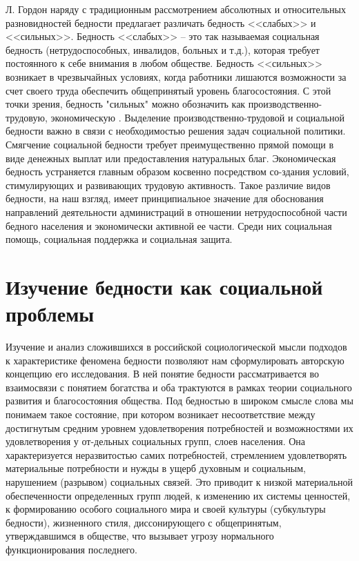 Л. Гордон наряду с традиционным рассмотрением абсолютных и относительных 
разновидностей бедности предлагает различать бедность <<слабых>> и <<сильных>>. 
Бедность <<слабых>> -- это так называемая социальная бедность (нетрудоспособных, 
инвалидов, больных и т.д.), которая требует постоянного к себе внимания в 
любом обществе. Бедность <<сильных>> возникает в чрезвычайных условиях, когда 
работники лишаются возможности за счет своего труда обеспечить общепринятый 
уровень благосостояния. С этой точки зрения, бедность "сильных" можно 
обозначить как производственно-трудовую, экономическую \cite{volch_s2}. 
Выделение производственно-трудовой и социальной бедности важно в связи с 
необходимостью решения задач социальной политики. Смягчение социальной 
бедности требует преимущественно прямой помощи в виде денежных выплат или 
предоставления натуральных благ. Экономическая бедность устраняется главным 
образом косвенно посредством со-здания условий, стимулирующих и развивающих 
трудовую активность. Такое различие видов бедности, на наш взгляд, имеет 
принципиальное значение для обоснования направлений деятельности 
администраций в отношении нетрудоспособной части бедного населения и 
экономически активной ее части. Среди них социальная помощь, социальная 
поддержка и социальная защита.

\chapter{Изучение бедности как социальной проблемы}
Изучение и анализ сложившихся в российской социологической мысли подходов к 
характеристике феномена бедности позволяют нам сформулировать авторскую 
концепцию его исследования. В ней понятие бедности рассматривается во 
взаимосвязи с понятием богатства и оба трактуются в рамках теории социального 
развития и благосостояния общества. Под бедностью в широком смысле слова мы 
понимаем такое состояние, при котором возникает несоответствие между 
достигнутым средним уровнем удовлетворения потребностей и возможностями их 
удовлетворения у от-дельных социальных групп, слоев населения. Она 
характеризуется неразвитостью самих потребностей, стремлением удовлетворять 
материальные потребности и нужды в ущерб духовным и социальным, нарушением 
(разрывом) социальных связей. Это приводит к низкой материальной 
обеспеченности определенных групп людей, к изменению их системы ценностей, к 
формированию особого социального мира и своей культуры (субкультуры бедности), 
жизненного стиля, диссонирующего с общепринятым, утверждавшимся в обществе, 
что вызывает угрозу нормального функционирования последнего.

